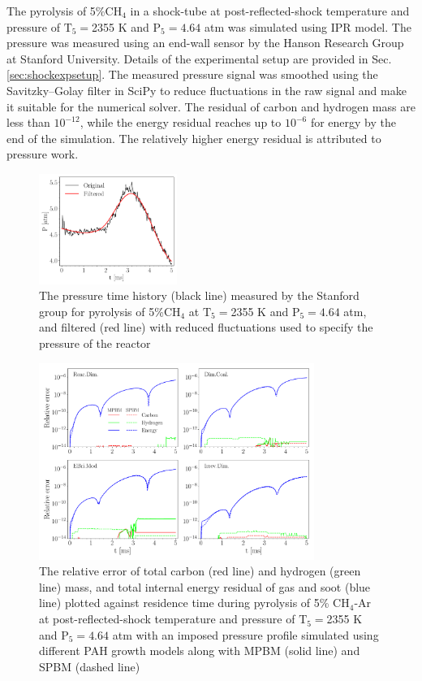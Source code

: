 The pyrolysis of 5\%$ \mathrm{CH_4}$ in a shock-tube at post-reflected-shock temperature and pressure of $\mathrm{T_5}=$2355 K and $\mathrm{P_5}=4.64$ atm was simulated using IPR model. The pressure was measured using an end-wall sensor by the Hanson Research Group at Stanford University. Details of the experimental setup are provided in Sec.\ref{sec:shockexpsetup}. The measured pressure signal was smoothed using the Savitzky–Golay filter in SciPy\citep{2020SciPy} to reduce fluctuations in the raw signal and make it suitable for the numerical solver. The residual of carbon and hydrogen mass are less than $10^{-12}$, while the energy residual reaches up to $10^{-6}$ for energy by the end of the simulation. The relatively higher energy residual is attributed to pressure work.
\begin{figure}[H]
	\centering
	\includegraphics[width=0.4\textwidth]{Figures/Results/Validation/IPR/pressure.pdf}
	\caption{The pressure time history (black line) measured by the Stanford group for pyrolysis of 5\%$\mathrm{CH_4}$ at $\mathrm{T_5}=$2355 K and $\mathrm{P_5}=4.64$ atm, and filtered (red line) with reduced fluctuations used to specify the pressure of the reactor}
	\label{fig:iprpressurevalid}
\end{figure}


\begin{figure}[H]
	\centering
	\includegraphics[width=0.8\textwidth]{Figures/Results/Validation/IPR/relerr_pressure.pdf}
	\caption{The relative error of total carbon (red line) and hydrogen (green line) mass, and total internal energy residual of gas and soot (blue line) plotted against residence time during pyrolysis of 5\% $\mathrm{CH_4}$-Ar at post-reflected-shock temperature and pressure of $\mathrm{T_5}=$2355 K and $\mathrm{P_5}=4.64$ atm with an imposed pressure profile simulated using different PAH growth models along with MPBM (solid line) and SPBM (dashed line)}
	\label{fig:iprvalid}
\end{figure}


